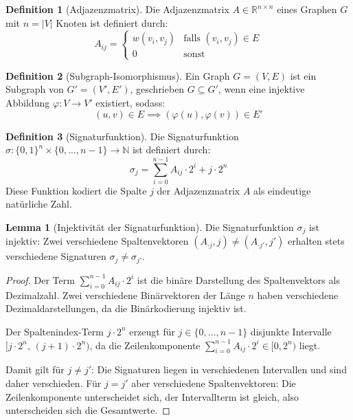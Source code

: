 ﻿\documentclass[a4paper,12pt]{article}
\theoremstyle{definition}
\newtheorem{definition}{Definition}
\newtheorem{lemma}{Lemma}
\begin{document}
\begin{definition}[Adjazenzmatrix]
	Die Adjazenzmatrix $A \in \mathbb{R}^{n \times n}$ eines Graphen $G$ mit
	$n = |V|$ Knoten ist definiert durch:
	\[
	A_{ij} = \begin{cases}
		w(v_i, v_j) & \text{falls } (v_i, v_j) \in E \\
		0 & \text{sonst}
	\end{cases}
	\]
\end{definition}

\begin{definition}[Subgraph-Isomorphismus]
	Ein Graph $G = (V, E)$ ist ein Subgraph von $G' = (V', E')$,
	geschrieben $G \subseteq G'$, wenn eine injektive Abbildung
	$\varphi: V \to V'$ existiert, sodass:
	\[
	(u, v) \in E \implies (\varphi(u), \varphi(v)) \in E'
	\]
\end{definition}

\begin{definition}[Signaturf\/unktion]
	Die Signaturfunktion $\sigma: \{0,1\}^n \times \{0,\ldots,n-1\} \to \mathbb{N}$
	ist definiert durch:
	\[
	\sigma_j = \sum_{i=0}^{n-1} A_{ij} \cdot 2^i + j \cdot 2^n
	\]
	Diese Funktion kodiert die Spalte $j$ der Adjazenzmatrix $A$ als eindeutige
	natürliche Zahl.
\end{definition}

\begin{lemma}[Injektivität der Signaturfunktion]
\label{lem:injektiv}
	Die Signaturfunktion $\sigma_j$ ist injektiv: Zwei verschiedene
	Spaltenvektoren $(A_{\cdot j}, j) \neq (A_{\cdot j'}, j')$ erhalten
	stets verschiedene Signaturen $\sigma_j \neq \sigma_{j'}$.
\end{lemma}

\begin{proof}
	Der Term $\sum_{i=0}^{n-1} A_{ij} \cdot 2^i$ ist die binäre Darstellung
	des Spaltenvektors als Dezimalzahl. Zwei verschiedene Binärvektoren der
	Länge $n$ haben verschiedene Dezimaldarstellungen, da die Binärkodierung
	injektiv ist.

	Der Spaltenindex-Term $j \cdot 2^n$ erzeugt für $j \in \{0,\ldots,n-1\}$
	disjunkte Intervalle $[j \cdot 2^n,\, (j+1) \cdot 2^n)$, da die
	Zeilenkomponente $\sum_{i=0}^{n-1} A_{ij} \cdot 2^i \in [0, 2^n)$ liegt.

	Damit gilt für $j \neq j'$: Die Signaturen liegen in verschiedenen
	Intervallen und sind daher verschieden. Für $j = j'$ aber verschiedene
	Spaltenvektoren: Die Zeilenkomponente unterscheidet sich, der Intervallterm
	ist gleich, also unterscheiden sich die Gesamtwerte.
\end{proof}
\end{document}

